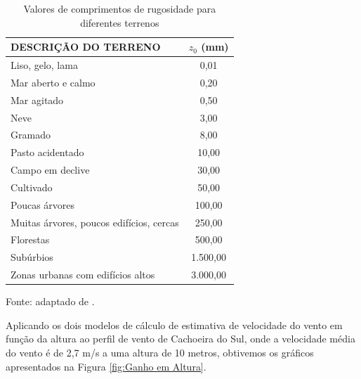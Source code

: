         \begin{table}[h!]
            \centering
            \caption{Valores de comprimentos de rugosidade para diferentes terrenos}
            \label{tab:comprimento-rugosidade}
            \begin{tabular}{l|c}
                \hline
                \textbf{DESCRIÇÃO DO TERRENO} & \textbf{$z_0$ (mm)} \\ \hline
                Liso, gelo, lama & 0,01 \\ \hline
                Mar aberto e calmo & 0,20 \\ \hline
                Mar agitado & 0,50 \\ \hline
                Neve & 3,00 \\ \hline
                Gramado & 8,00 \\ \hline
                Pasto acidentado & 10,00 \\ \hline
                Campo em declive & 30,00 \\ \hline
                Cultivado & 50,00 \\ \hline
                Poucas árvores & 100,00 \\ \hline
                Muitas árvores, poucos edifícios, cercas & 250,00 \\ \hline
                Florestas & 500,00 \\ \hline
                Subúrbios & 1.500,00 \\ \hline
                Zonas urbanas com edifícios altos & 3.000,00 \\ \hline
            \end{tabular}
            \begin{flushleft}
                \footnotesize{Fonte:  adaptado de .}
            \end{flushleft}
        \end{table}

        \par Aplicando os dois modelos de cálculo de estimativa de velocidade do vento em função da altura ao perfil de vento de Cachoeira do Sul, onde a velocidade média do vento é de 2,7 m/s a uma altura de 10 metros, obtivemos os gráficos apresentados na Figura \ref{fig:Ganho em Altura}.

